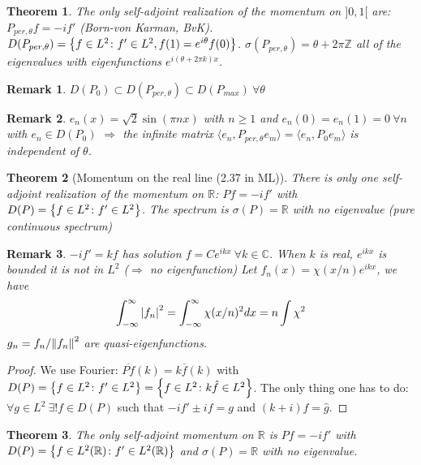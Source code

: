 \documentclass{article}
\newtheorem*{theorem}{Theorem}
\newtheorem*{remark}{Remark}
\newcommand{\ZZ}{\mathbb{Z}}
\newcommand{\RR}{\mathbb{R}}
\newcommand{\CC}{\mathbb{C}}
\newcommand{\sig}{\sigma}
\renewcommand{\sp}[2]{\langle #1,#2 \rangle}
\begin{document}
\begin{theorem} 
  The only self-adjoint realization of the momentum on $]0,1[$ are:
  $P_{per,\theta} f = - i f'$ (Born-von Karman, BvK).
  $D(P_{per,\theta}) = \qty{ f \in L^2 \colon f' \in L^2, f(1) = e^{i \theta} f(0) }$.
  $\sig(P_{per,\theta}) = \theta + 2\pi \ZZ$ all of the eigenvalues with eigenfunctions $e^{i(\theta+2\pi k)x}$.
\end{theorem}

\begin{remark} 
  $D(P_0) \subset D(P_{per,\theta}) \subset D(P_{max}) \ \forall \theta$ 
\end{remark}

\begin{remark}
  $e_n(x) = \sqrt{2} \sin(\pi n x)$ with $n \ge 1$ 
  and $e_n(0) = e_n(1) = 0 \ \forall n$ with $e_n \in D(P_0)$
  $\Rightarrow$ the infinite matrix $\sp{e_n}{P_{per,\theta} e_m} = \sp{e_n}{P_0 e_m}$ is independent of $\theta$.
\end{remark}

\begin{theorem}[Momentum on the real line (2.37 in ML)]
  There is only one self-adjoint realization of the momentum on $\RR$:
  $P f = - i f'$ with $D(P) = \qty{ f \in L^2 \colon f' \in L^2 }$. 
  The spectrum is $\sig(P) = \RR$ with no eigenvalue (pure continuous spectrum)
\end{theorem}

\begin{remark}
  $-i f' = k f$ has solution $f = C e^{ikx} \ \forall k \in \CC$. 
  When $k$ is real, $e^{ikx}$ is bounded it is not in $L^2$ ($\Rightarrow$ no eigenfunction)
  Let $f_n(x) = \chi(x/n) e^{ikx}$, we have
  $$\int_{-\infty}^{\infty} \abs{f_n}^2 = \int_{-\infty}^{\infty} \chi(x/n)^2 dx = n \int \chi^2$$
  $g_n = f_n/\norm{f_n}^2$ are quasi-eigenfunctions.
\end{remark}

\begin{proof} 
  We use Fourier: $\overline{P f}(k) = k \overline{f}(k)$
  with $D(P) = \qty{ f \in L^2 \colon f' \in L^2 } = \qty{ f \in L^2 \colon k \hat{f} \in L^2 }$.
  The only thing one has to do:
  $\forall g \in L^2 \ \exists! f \in D(P)$ such that $-i f' \pm i f = g$ and $(k+i) \hat{f} = \hat{g}$.
\end{proof}

\begin{theorem} 
  The only self-adjoint momentum on $\RR$ is
  $P f = -i f'$ with $D(P) = \qty{f \in L^2(\RR) \colon f' \in L^2(\RR) }$
  and $\sig(P) = \RR$ with no eigenvalue.
\end{theorem} 
\end{document}
